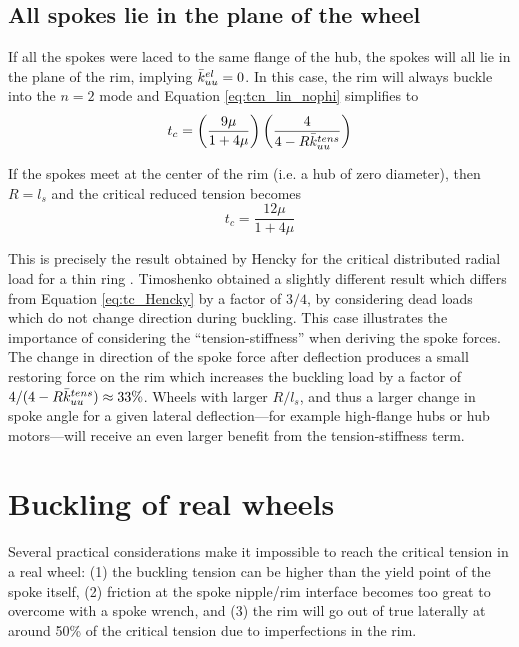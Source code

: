 \documentclass[\rootdir/thesis.tex]{subfiles}
\begin{document}
\subsection{All spokes lie in the plane of the wheel}

If all the spokes were laced to the same flange of the hub, the spokes will all lie in the plane of the rim, implying $\bar{k}_{uu}^{el}=0$. In this case, the rim will always buckle into the $n=2$ mode and Equation \eqref{eq:tcn_lin_nophi} simplifies to
\begin{equation}
t_c = \left(\frac{9\mu}{1 + 4\mu}\right)\left(\frac{4}{4 - R\bar{k}_{uu}^{tens}}\right)
\end{equation}

If the spokes meet at the center of the rim (i.e. a hub of zero diameter), then $R=l_s$ and the critical reduced tension becomes
\begin{equation}
\label{eq:tc_Hencky}
t_c = \frac{12\mu}{1 + 4\mu}
\end{equation}

This is precisely the result obtained by Hencky for the critical distributed radial load for a thin ring \cite{Timoshenko1961}. Timoshenko obtained a slightly different result which differs from Equation \eqref{eq:tc_Hencky} by a factor of  $3/4$, by considering dead loads which do not change direction during buckling. This case illustrates the importance of considering the ``tension-stiffness'' when deriving the spoke forces. The change in direction of the spoke force after deflection produces a small restoring force on the rim which increases the buckling load by a factor of $4/(4 - R\bar{k}_{uu}^{tens}) \approx 33\%$. Wheels with larger $R/l_s$, and thus a larger change in spoke angle for a given lateral deflection---for example high-flange hubs or hub motors---will receive an even larger benefit from the tension-stiffness term.

\section{Buckling of real wheels}
\label{sec:K2_tension_buckling}

Several practical considerations make it impossible to reach the critical tension in a real wheel: (1) the buckling tension can be higher than the yield point of the spoke itself, (2) friction at the spoke nipple/rim interface becomes too great to overcome with a spoke wrench, and (3) the rim will go out of true laterally at around 50\% of the critical tension due to imperfections in the rim.
\end{document}
